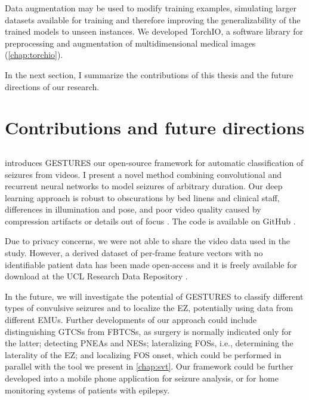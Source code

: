 Data augmentation may be used to modify training examples, simulating larger datasets available for training and therefore improving the generalizability of the trained models to unseen instances.
We developed TorchIO, a software library for preprocessing and augmentation of multidimensional medical images (\cref{chap:torchio}).

In the next section, I summarize the contributions of this thesis and the future directions of our research.


\section{Contributions and future directions}

\subsection{}

 introduces \ac{GESTURES} our open-source framework for automatic classification of seizures from videos.
I present a novel method combining convolutional and recurrent neural networks to model seizures of arbitrary duration.
Our deep learning approach is robust to obscurations by bed linens and clinical staff, differences in illumination and pose, and poor video quality caused by compression artifacts or details out of focus \cite{perez-garcia_transfer_2021}.
The code is available on GitHub%
.

Due to privacy concerns, we were not able to share the video data used in the study.
However, a derived dataset of per-frame feature vectors with no identifiable patient data has been made open-access and it is freely available for download at the UCL Research Data Repository \cite{perez-garcia_data_2021}.

In the future, we will investigate the potential of \ac{GESTURES} to classify different types of convulsive seizures and to localize the \ac{EZ}, potentially using data from different \acp{EMU}.
Further developments of our approach could include
distinguishing \acp{GTCS} from \acp{FBTCS}, as surgery is normally indicated only for the latter;
detecting \acp{PNEA} and \acp{NES};
lateralizing \acp{FOS}, i.e., determining the laterality of the \ac{EZ};
and localizing \ac{FOS} onset, which could be performed in parallel with the tool we present in \cref{chap:svt}.
Our framework could be further developed into a mobile phone application for seizure analysis, or for home monitoring systems of patients with epilepsy.


